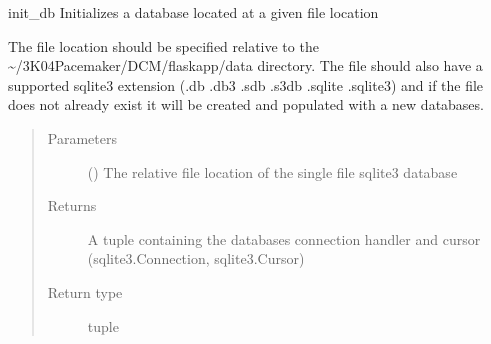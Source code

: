 \documentclass[letterpaper,10pt,english]{sphinxmanual}
\begin{document}
\begin{fulllineitems}
\label{\detokenize{flaskapp.data:flaskapp.data.database.init_db}}
init\_db Initializes a database located at a given file location

The file location should be specified relative to the \textasciitilde{}/3K04\sphinxhyphen{}Pacemaker/DCM/flaskapp/data
directory. The file should also have a supported sqlite3 extension (.db .db3 .sdb .s3db
.sqlite .sqlite3) and if the file does not already exist it will be created and
populated with a new databases.
\begin{quote}\begin{description}
\item[{Parameters}] \leavevmode
{} () \textendash{} The relative file location of the single file sqlite3 database

\item[{Returns}] \leavevmode
A tuple containing the databases connection handler and cursor (sqlite3.Connection, sqlite3.Cursor)

\item[{Return type}] \leavevmode
tuple

\end{description}\end{quote}

\end{fulllineitems}

\end{document}
